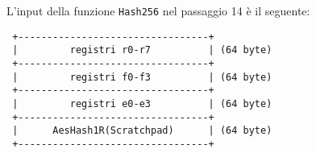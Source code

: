 L'input della funzione \texttt{Hash256} nel passaggio 14 è il seguente:

\begin{verbatim}
 +---------------------------------+
 |         registri r0-r7          | (64 byte)
 +---------------------------------+
 |         registri f0-f3          | (64 byte)
 +---------------------------------+
 |         registri e0-e3          | (64 byte)
 +---------------------------------+
 |      AesHash1R(Scratchpad)      | (64 byte)
 +---------------------------------+
\end{verbatim}


